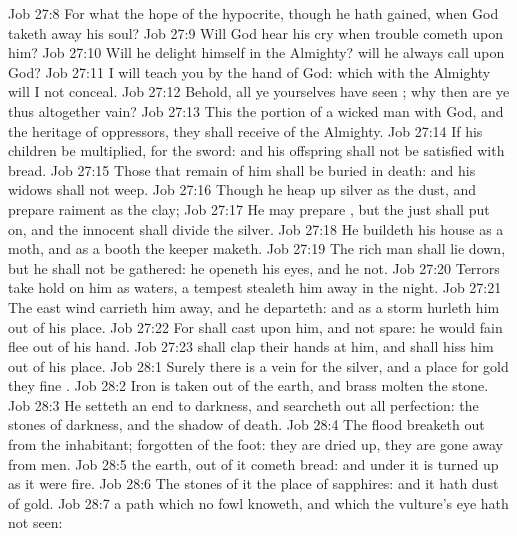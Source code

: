 \vs Job 27:8 For what  the hope of the hypocrite, though he hath gained, when God taketh away his soul?
\vs Job 27:9 Will God hear his cry when trouble cometh upon him?
\vs Job 27:10 Will he delight himself in the Almighty? will he always call upon God?
\vs Job 27:11 I will teach you by the hand of God:  which  with the Almighty will I not conceal.
\vs Job 27:12 Behold, all ye yourselves have seen ; why then are ye thus altogether vain?
\vs Job 27:13 This  the portion of a wicked man with God, and the heritage of oppressors,  they shall receive of the Almighty.
\vs Job 27:14 If his children be multiplied,  for the sword: and his offspring shall not be satisfied with bread.
\vs Job 27:15 Those that remain of him shall be buried in death: and his widows shall not weep.
\vs Job 27:16 Though he heap up silver as the dust, and prepare raiment as the clay;
\vs Job 27:17 He may prepare , but the just shall put  on, and the innocent shall divide the silver.
\vs Job 27:18 He buildeth his house as a moth, and as a booth  the keeper maketh.
\vs Job 27:19 The rich man shall lie down, but he shall not be gathered: he openeth his eyes, and he  not.
\vs Job 27:20 Terrors take hold on him as waters, a tempest stealeth him away in the night.
\vs Job 27:21 The east wind carrieth him away, and he departeth: and as a storm hurleth him out of his place.
\vs Job 27:22 For  shall cast upon him, and not spare: he would fain flee out of his hand.
\vs Job 27:23  shall clap their hands at him, and shall hiss him out of his place.
\vs Job 28:1 Surely there is a vein for the silver, and a place for gold  they fine .
\vs Job 28:2 Iron is taken out of the earth, and brass  molten  the stone.
\vs Job 28:3 He setteth an end to darkness, and searcheth out all perfection: the stones of darkness, and the shadow of death.
\vs Job 28:4 The flood breaketh out from the inhabitant;  forgotten of the foot: they are dried up, they are gone away from men.
\vs Job 28:5  the earth, out of it cometh bread: and under it is turned up as it were fire.
\vs Job 28:6 The stones of it  the place of sapphires: and it hath dust of gold.
\vs Job 28:7  a path which no fowl knoweth, and which the vulture's eye hath not seen:

